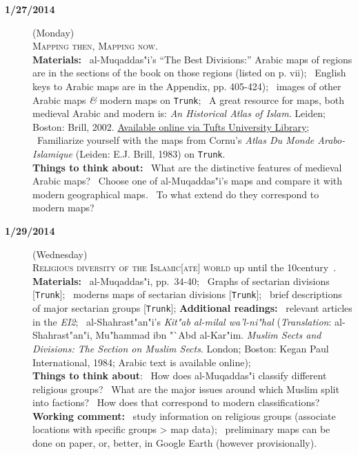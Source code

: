 \documentclass{tufte-handout} %
\newcommand{\Trunk}{\texttt{Trunk}}
\def\and{\textit{\&}\xspace}
\begin{document}
\begin{description}
\noindent\hrulefill

\item[\textbf{1/27/2014}](Monday)\\
\textsc{Mapping then, Mapping now.}\\
\textbf{Materials:}
\textbullet~al-Muqaddas"i's ``The Best Divisions:'' Arabic maps of regions are in the sections of the book on those regions (listed on p. vii); \textbullet~English keys to Arabic maps are in the Appendix, pp. 405-424); \textbullet~images of other Arabic maps \and modern maps on \Trunk;
\textbullet~A great resource for maps, both medieval Arabic and modern is: \textit{An Historical Atlas of Islam}. Leiden; Boston: Brill, 2002. \href{http://referenceworks.brillonline.com.ezproxy.library.tufts.edu/browse/historical-atlas-of-islam}{Available online via Tufts University Library}; 
\textbullet~Familiarize yourself with the maps from Cornu's \textit{Atlas Du Monde Arabo-Islamique} (Leiden: E.J. Brill, 1983) on \Trunk.\\
\textbf{Things to think about:} \textbullet~What are the distinctive features of medieval Arabic maps? \textbullet~Choose one of al-Muqaddas"i's maps and compare it with modern geographical maps. \textbullet~To what extend do they correspond to modern maps?



\item[\textbf{1/29/2014}] (Wednesday)\\
\textsc{Religious diversity of the Islamic[ate] world} up until the 10\thh century~\CE.
\textbf{Materials:}
\textbullet~al-Muqaddas"i, pp.~34-40;
\textbullet~Graphs of sectarian divisions [\Trunk];
\textbullet~moderns maps of sectarian divisions [\Trunk];
\textbullet~brief descriptions of major sectarian groups [\Trunk];
\textbf{Additional readings:}
\textbullet~relevant articles in the \textit{EI2};
\textbullet~al-Shahrast"an"i's \textit{Kit"ab al-milal wa'l-ni"hal} (\textit{Translation}: al-Shahrast"an"i, Mu"hammad ibn "`Abd al-Kar"im. \textit{Muslim Sects and Divisions: The Section on Muslim Sects}. London; Boston: Kegan Paul International, 1984; Arabic text is available online);\\
\textbf{Things to think about}: \textbullet~How does al-Muqaddas"i classify different religious groups? \textbullet~What are the major issues around which Muslim split into factions? \textbullet~How does that correspond to modern classifications?\\
\textbf{Working comment:} \textbullet~study information on religious groups (associate locations with specific groups > map data); \textbullet~preliminary maps can be done on paper, or, better, in Google Earth (however provisionally).


\end{description}
\end{document}
